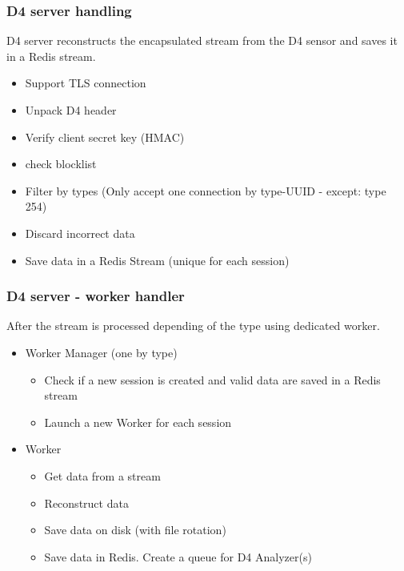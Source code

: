 \documentclass{beamer}
\begin{document}
\begin{frame}
\frametitle{D4 server handling}

D4 server reconstructs the encapsulated stream from the D4 sensor and saves it in a Redis stream.

\begin{itemize}
\item Support TLS connection
\item Unpack D4 header
\item Verify client secret key (HMAC)
\item check blocklist
\item Filter by types (Only accept one connection by type-UUID - except: type 254)
\item Discard incorrect data
\item Save data in a Redis Stream (unique for each session)
\end{itemize}
\end{frame}

\begin{frame}
        \frametitle{D4 server - worker handler}
After the stream is processed depending of the type using dedicated worker.
        \begin{itemize}
        \item Worker Manager (one by type)
                \begin{itemize}
                \item Check if a new session is created and valid data are saved in a Redis stream
                \item Launch a new Worker for each session
                \end{itemize}
        \item Worker
                \begin{itemize}
                 \item Get data from a stream
    		     \item Reconstruct data
                 \item Save data on disk (with file rotation)
                 \item Save data in Redis. Create a queue for D4 Analyzer(s)
                \end{itemize}
        \end{itemize}
\end{frame}
\end{document}
